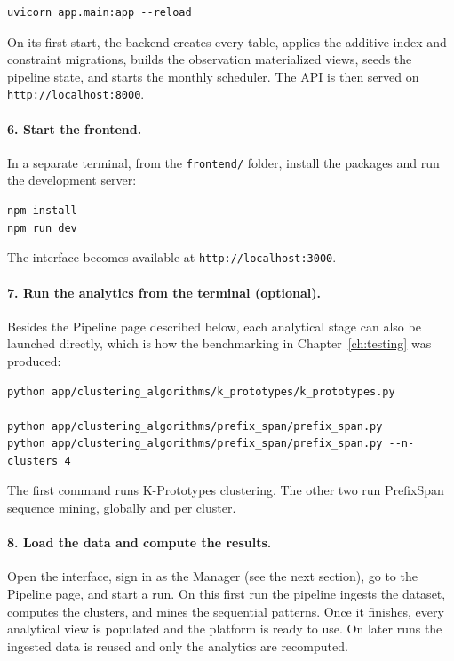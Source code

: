 \begin{lstlisting}[style=basestyle]
uvicorn app.main:app --reload
\end{lstlisting}

\noindent On its first start, the backend creates every table, applies the additive index and constraint migrations, builds the observation materialized views, seeds the pipeline state, and starts the monthly scheduler. The API is then served on \texttt{http://localhost:8000}.

\paragraph{6. Start the frontend.} In a separate terminal, from the \texttt{frontend/} folder, install the packages and run the development server:

\begin{lstlisting}[style=basestyle]
npm install
npm run dev
\end{lstlisting}

\noindent The interface becomes available at \texttt{http://localhost:3000}.

\paragraph{7. Run the analytics from the terminal (optional).} Besides the Pipeline page described below, each analytical stage can also be launched directly, which is how the benchmarking in Chapter~\ref{ch:testing} was produced:

\begin{lstlisting}[style=pythonstyle]
python app/clustering_algorithms/k_prototypes/k_prototypes.py

python app/clustering_algorithms/prefix_span/prefix_span.py
python app/clustering_algorithms/prefix_span/prefix_span.py --n-clusters 4
\end{lstlisting}

\noindent The first command runs K-Prototypes clustering. The other two run PrefixSpan sequence mining, globally and per cluster.

\paragraph{8. Load the data and compute the results.} Open the interface, sign in as the Manager (see the next section), go to the Pipeline page, and start a run. On this first run the pipeline ingests the dataset, computes the clusters, and mines the sequential patterns. Once it finishes, every analytical view is populated and the platform is ready to use. On later runs the ingested data is reused and only the analytics are recomputed.

